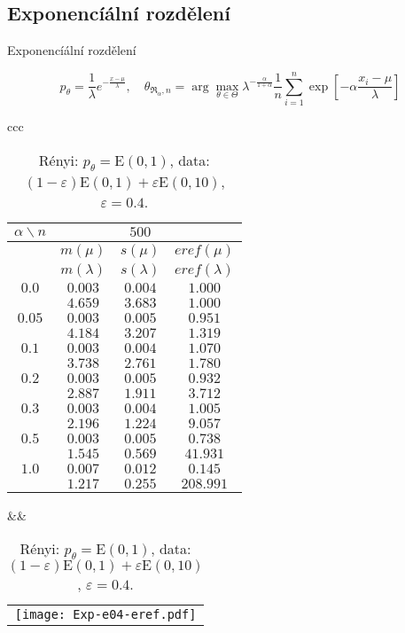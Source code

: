 \documentclass[11pt,a4paper]{beamer}
\newcommand{\amtiT}{\arg \max_{\theta \in \Theta}}
\begin{document}
\subsection{Exponencíální rozdělení}
\begin{frame}{Exponencíální rozdělení} %

{\footnotesize	\[ p_\theta = \frac{1}{\lambda} e^{-\frac{x-\mu}{\lambda}  }, \quad \theta_{\mathfrak{R}_\alpha,n} = \amtiT \lambda^{-\frac{\alpha}{1+\alpha}} \frac{1}{n}\sum_{i=1}^n \exp \left[-\alpha\frac{x_i-\mu}{\lambda} \right] \]}
\begin{table}[htb] \tiny
\begin{center}
\begin{tabular}{ccc}
	\begin{tabular}{|c|ccc|}
	\hline
	$\alpha\backslash n$ && $500$ & \\
	\hline
	& $m(\mu)$ & $s(\mu)$ & $eref(\mu)$ \\
	& $m(\lambda)$ & $s(\lambda)$ & $eref(\lambda)$ \\
	\hline
	$0.0$ & $ 0.003 $ & $ 0.004 $ & $ 1.000 $\\
	 & $ 4.659 $ & $ 3.683 $ & $ 1.000 $\\
	\hline
	$0.05$ & $ 0.003 $ & $ 0.005 $ & $ 0.951 $\\
	 & $ 4.184 $ & $ 3.207 $ & $ 1.319 $\\
	\hline
	$0.1$ & $ 0.003 $ & $ 0.004 $ & $ 1.070 $\\
	 & $ 3.738 $ & $ 2.761 $ & $ 1.780 $\\
	\hline
	$0.2$ & $ 0.003 $ & $ 0.005 $ & $ 0.932 $\\
	 & $ 2.887 $ & $ 1.911 $ & $ 3.712 $\\
	\hline
	$0.3$ & $ 0.003 $ & $ 0.004 $ & $ 1.005 $\\
	 & $ 2.196 $ & $ 1.224 $ & $ 9.057 $\\
	\hline
	$0.5$ & $ 0.003 $ & $ 0.005 $ & $ 0.738 $\\
	 & $ 1.545 $ & $ 0.569 $ & $ 41.931 $\\
	\hline
	$1.0$ & $ 0.007 $ & $ 0.012 $ & $ 0.145 $\\
	 & $ 1.217 $ & $ 0.255 $ & $ 208.991 $\\
	\hline
	\end{tabular}
&&
	\begin{tabular}{c}
		\texttt{[image: Exp-e04-eref.pdf]}
	\end{tabular}
\\
\end{tabular}
\end{center}
\caption{R\'{e}nyi: $p_\theta = \mathrm{E}(0,1)$, data: $(1-\varepsilon)\mathrm{E}(0,1) + \varepsilon \mathrm{E}(0,10)$, $\varepsilon =  0.4$.}
\label{tabJK:exponential-eref}
\end{table}	
\end{frame}
\end{document}
